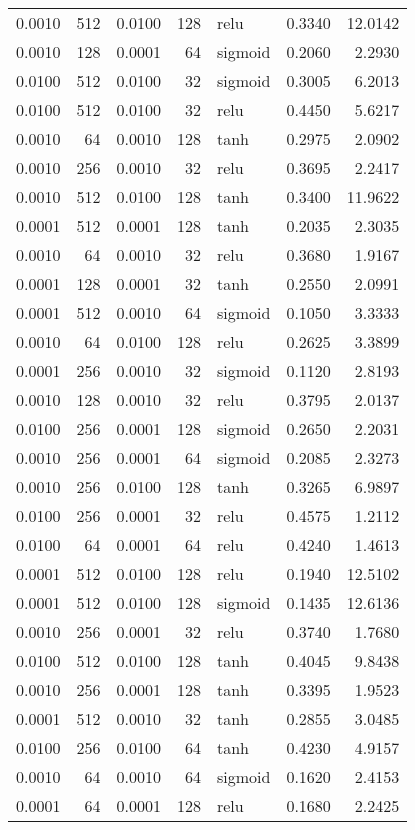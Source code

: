 \begin{table}
\begin{tabular}{rrrrlrr}
0.0010 & 512 & 0.0100 & 128 & relu & 0.3340 & 12.0142 \\
0.0010 & 128 & 0.0001 & 64 & sigmoid & 0.2060 & 2.2930 \\
0.0100 & 512 & 0.0100 & 32 & sigmoid & 0.3005 & 6.2013 \\
0.0100 & 512 & 0.0100 & 32 & relu & 0.4450 & 5.6217 \\
0.0010 & 64 & 0.0010 & 128 & tanh & 0.2975 & 2.0902 \\
0.0010 & 256 & 0.0010 & 32 & relu & 0.3695 & 2.2417 \\
0.0010 & 512 & 0.0100 & 128 & tanh & 0.3400 & 11.9622 \\
0.0001 & 512 & 0.0001 & 128 & tanh & 0.2035 & 2.3035 \\
0.0010 & 64 & 0.0010 & 32 & relu & 0.3680 & 1.9167 \\
0.0001 & 128 & 0.0001 & 32 & tanh & 0.2550 & 2.0991 \\
0.0001 & 512 & 0.0010 & 64 & sigmoid & 0.1050 & 3.3333 \\
0.0010 & 64 & 0.0100 & 128 & relu & 0.2625 & 3.3899 \\
0.0001 & 256 & 0.0010 & 32 & sigmoid & 0.1120 & 2.8193 \\
0.0010 & 128 & 0.0010 & 32 & relu & 0.3795 & 2.0137 \\
0.0100 & 256 & 0.0001 & 128 & sigmoid & 0.2650 & 2.2031 \\
0.0010 & 256 & 0.0001 & 64 & sigmoid & 0.2085 & 2.3273 \\
0.0010 & 256 & 0.0100 & 128 & tanh & 0.3265 & 6.9897 \\
0.0100 & 256 & 0.0001 & 32 & relu & 0.4575 & 1.2112 \\
0.0100 & 64 & 0.0001 & 64 & relu & 0.4240 & 1.4613 \\
0.0001 & 512 & 0.0100 & 128 & relu & 0.1940 & 12.5102 \\
0.0001 & 512 & 0.0100 & 128 & sigmoid & 0.1435 & 12.6136 \\
0.0010 & 256 & 0.0001 & 32 & relu & 0.3740 & 1.7680 \\
0.0100 & 512 & 0.0100 & 128 & tanh & 0.4045 & 9.8438 \\
0.0010 & 256 & 0.0001 & 128 & tanh & 0.3395 & 1.9523 \\
0.0001 & 512 & 0.0010 & 32 & tanh & 0.2855 & 3.0485 \\
0.0100 & 256 & 0.0100 & 64 & tanh & 0.4230 & 4.9157 \\
0.0010 & 64 & 0.0010 & 64 & sigmoid & 0.1620 & 2.4153 \\
0.0001 & 64 & 0.0001 & 128 & relu & 0.1680 & 2.2425 \\

\end{tabular}
\end{table}
